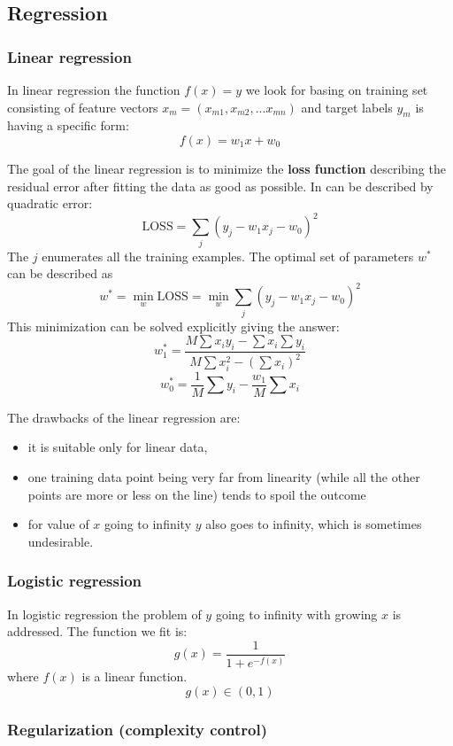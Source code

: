 \documentclass[a4paper,10pt]{article}
\begin{document}
\subsection{Regression}
\subsubsection{Linear regression}

In linear regression the function $f(x)=y$ we look for basing on training set consisting of feature vectors $x_m=(x_{m1}, x_{m2}, ... x_{mn})$ and target labels $y_m$ is having a specific form:
\[ f(x) = w_1x+w_0\]

The goal of the linear regression is to minimize the \textbf{loss function} describing the residual error after fitting the data as good as possible. In can be described by quadratic error:
\[\mathrm{LOSS} = \sum_{j} \left( y_j - w_1 x_j - w_0\right)^2\]
The $j$ enumerates all the training examples. The optimal set of parameters $w^*$ can be described as
\[w^* = \min_w \mathrm{LOSS} = \min_w \sum_{j} \left( y_j - w_1 x_j - w_0\right)^2 \]
This minimization can be solved explicitly giving the answer:
\[ w_1^* = \frac{M \sum x_i y_i - \sum x_i \sum y_i}{M \sum x_i^2 - \left( \sum x_i \right)^2 } \]
\[ w_0^* = \frac{1}{M} \sum  y_i - \frac{w_1}{M}\sum x_i \]

The drawbacks of the linear regression are:\begin{itemize}
\item it is suitable only for linear data,
\item one training data point being very far from linearity (while all the other points are more or less on the line) tends to spoil the outcome
\item for value of $x$ going to infinity $y$ also goes to infinity, which is sometimes undesirable.
\end{itemize}

\subsubsection{Logistic regression}

In logistic regression the problem of $y$ going to infinity with growing $x$ is addressed. The function we fit is:
\[ g(x) = \frac{1}{1+e^{-f(x)}} \]
where $f(x)$ is a linear function. 
\[g(x) \in (0,1)\]

\subsubsection{Regularization (complexity control)}
\end{document}
